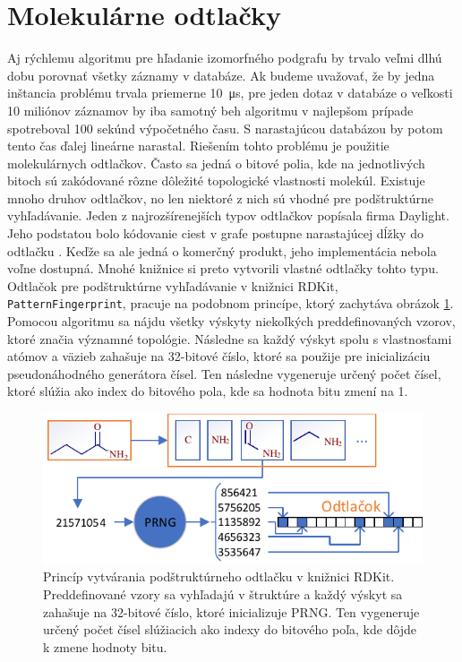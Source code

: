 \documentclass[slovak]{ExcelAtFIT} %
\begin{document}
\section{Molekulárne odtlačky}
Aj rýchlemu algoritmu pre hľadanie izomorfného podgrafu by trvalo veľmi dlhú dobu porovnať všetky zá\-zna\-my v databáze. Ak budeme uvažovať, že by jedna inštancia problému trvala priemerne \SI{10}{\micro\second}, pre jeden dotaz v databáze o veľkosti 10 miliónov záznamov by iba samotný beh algoritmu v najlepšom prípade spotreboval 100 sekúnd výpočetného času. S narastajúcou databázou by potom tento čas ďalej lineárne narastal. Riešením tohto problému je použitie molekulárnych odtlačkov. Často sa jedná o bitové polia, kde na jednotlivých bitoch sú zakódované rôzne dôležité topologické vlastnosti molekúl. Existuje mnoho druhov odtlačkov, no len niektoré z nich sú vhodné pre pod\-štruk\-túrne vyhľadávanie. Jeden z najrozšírenejších typov odtlačkov popísala firma Daylight. Jeho podstatou bolo kódovanie ciest v grafe postupne narastajúcej dĺžky do odtlačku \cite{daylight_fp}. Keďže sa ale jedná o komerčný produkt, jeho implementácia nebola voľne dostupná. Mnohé knižnice si preto vytvorili vlastné odtlačky tohto typu. Odtlačok pre podštruktúrne vyhľadávanie v knižnici RDKit, \\\texttt{PatternFingerprint}, pracuje na podobnom prin\-cípe, ktorý zachytáva obrázok \ref{fig:fp}. Pomocou algoritmu sa nájdu všetky výskyty niekoľkých preddefinovaných vzorov, ktoré značia významné topológie. Následne sa každý výskyt spolu s vlastnosťami atómov a väzieb zahašuje na 32-bitové číslo, ktoré sa použije pre inicializáciu pseudonáhodného generátora čísel. Ten následne vygeneruje určený počet čísel, ktoré slúžia ako index do bitového pola, kde sa hodnota bitu zmení na 1.

\begin{figure}[!htb]
	\centering
	\includegraphics[width=1\linewidth]{images/daylight.pdf}
	\caption{Princíp vytvárania podštruktúrneho odtlačku v knižnici RDKit. Preddefinované vzory sa vyhľadajú v štruktúre a každý výskyt sa zahašuje na 32-bitové číslo, ktoré inicializuje PRNG. Ten vygeneruje určený počet čísel slúžiacich ako indexy do bitového poľa, kde dôjde k zmene hodnoty bitu.}
	\label{fig:fp}
\end{figure}
\end{document}
